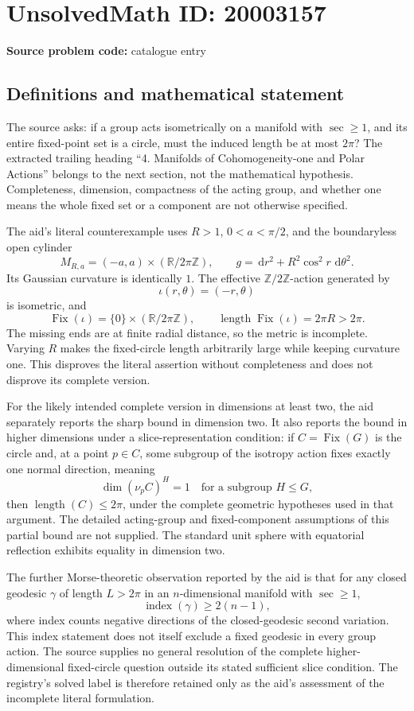 \documentclass[11pt]{article}
\newcommand{\Z}{\mathbb{Z}}
\newcommand{\R}{\mathbb{R}}
\newcommand{\dd}{\,\mathrm{d}}
\begin{document}
\section*{UnsolvedMath ID: 20003157}
\textbf{Source problem code:} catalogue entry
\subsection{Definitions and mathematical statement}
The source asks: if a group acts isometrically on a manifold with \(\sec\geq1\), and its entire fixed-point set is a circle, must the induced length be at most \(2\pi\)? The extracted trailing heading ``4. Manifolds of Cohomogeneity-one and Polar Actions'' belongs to the next section, not the mathematical hypothesis. Completeness, dimension, compactness of the acting group, and whether one means the whole fixed set or a component are not otherwise specified.

The aid's literal counterexample uses \(R>1\), \(0<a<\pi/2\), and the boundaryless open cylinder
\[
 M_{R,a}=(-a,a)\times(\R/2\pi\Z),\qquad
 g=\dd r^2+R^2\cos^2r\,\dd\theta^2.
\]
Its Gaussian curvature is identically \(1\). The effective \(\Z/2\Z\)-action generated by
\[
 \iota(r,\theta)=(-r,\theta)
\]
is isometric, and
\[
 \operatorname{Fix}(\iota)=\{0\}\times(\R/2\pi\Z),\qquad
 \operatorname{length}\operatorname{Fix}(\iota)=2\pi R>2\pi.
\]
The missing ends are at finite radial distance, so the metric is incomplete. Varying \(R\) makes the fixed-circle length arbitrarily large while keeping curvature one. This disproves the literal assertion without completeness and does not disprove its complete version.

For the likely intended complete version in dimensions at least two, the aid separately reports the sharp bound in dimension two. It also reports the bound in higher dimensions under a slice-representation condition: if \(C=\operatorname{Fix}(G)\) is the circle and, at a point \(p\in C\), some subgroup of the isotropy action fixes exactly one normal direction, meaning
\[
 \dim(\nu_pC)^H=1\quad\text{for a subgroup }H\leq G,
\]
then \(\operatorname{length}(C)\leq2\pi\), under the complete geometric hypotheses used in that argument. The detailed acting-group and fixed-component assumptions of this partial bound are not supplied. The standard unit sphere with equatorial reflection exhibits equality in dimension two.

The further Morse-theoretic observation reported by the aid is that for any closed geodesic \(\gamma\) of length \(L>2\pi\) in an \(n\)-dimensional manifold with \(\sec\geq1\),
\[
 \operatorname{index}(\gamma)\geq2(n-1),
\]
where index counts negative directions of the closed-geodesic second variation. This index statement does not itself exclude a fixed geodesic in every group action. The source supplies no general resolution of the complete higher-dimensional fixed-circle question outside its stated sufficient slice condition. The registry's solved label is therefore retained only as the aid's assessment of the incomplete literal formulation.
\end{document}
